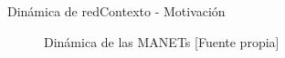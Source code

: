\begin{frame}{Dinámica de red}{Contexto - Motivación}
    \begin{figure}[htbp]
	    \centering
	    \caption{Dinámica de las MANETs [Fuente propia]}
	    \label{fig:DinMan}
    \end{figure}
\end{frame}
